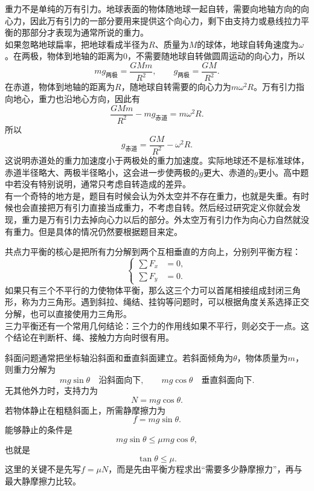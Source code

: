 \begin{casetypebox}[title={\strut\textcolor{white}{\bfseries 常见题型：重力的来源}}]
  重力不是单纯的万有引力。地球表面的物体随地球一起自转，需要向地轴方向的向心力，因此万有引力的一部分要用来提供这个向心力，剩下由支持力或悬线拉力平衡的那部分才表现为通常所说的重力。\\
  如果忽略地球扁率，把地球看成半径为$R$、质量为$M$的球体，地球自转角速度为$\omega$。在两极，物体到地轴的距离为0，不需要随地球自转做圆周运动的向心力，所以
  \[
    mg_{\text{两极}}=\frac{GMm}{R^2},
    \qquad
    g_{\text{两极}}=\frac{GM}{R^2}.
  \]
  在赤道，物体到地轴的距离为$R$，随地球自转需要的向心力为$m\omega^2R$。万有引力指向地心，重力也沿地心方向，因此有
  \[
    \frac{GMm}{R^2}-mg_{\text{赤道}}=m\omega^2R.
  \]
  所以
  \[
    g_{\text{赤道}}=\frac{GM}{R^2}-\omega^2R.
  \]
  这说明赤道处的重力加速度小于两极处的重力加速度。实际地球还不是标准球体，赤道半径略大、两极半径略小，这会进一步使两极的$g$更大、赤道的$g$更小。高中题中若没有特别说明，通常只考虑自转造成的差异。\\
  有一个奇特的地方是，题目有时候会认为外太空并不存在重力，也就是失重。有时候也会直接把万有引力直接当成重力，不考虑自转。然后经过研究定义你就会发现，重力是万有引力去掉向心力以后的部分。外太空万有引力作为向心力自然就没有重力。但是具体的情况仍然要根据题目来定。
\end{casetypebox}

\begin{casetypebox}[title={\strut\textcolor{white}{\bfseries 常见题型：共点力平衡}}]
  
  共点力平衡的核心是把所有力分解到两个互相垂直的方向上，分别列平衡方程：
  \[
    \left\{\begin{aligned}
      \sum F_x & =0, \\
      \sum F_y & =0.
    \end{aligned}\right.
  \]
  如果只有三个不平行的力使物体平衡，那么这三个力可以首尾相接组成封闭三角形，称为力三角形。遇到斜拉、绳结、挂钩等问题时，可以根据角度关系选择正交分解，也可以直接使用力三角形。\\
  三力平衡还有一个常用几何结论：三个力的作用线如果不平行，则必交于一点。这个结论在判断杆、绳、接触力方向时很有用。
\end{casetypebox}

\begin{casetypebox}[title={\strut\textcolor{white}{\bfseries 常见题型：斜面上的物体}}]
  斜面问题通常把坐标轴沿斜面和垂直斜面建立。若斜面倾角为$\theta$，物体质量为$m$，则重力分解为
  \[
    mg\sin\theta\quad\text{沿斜面向下},\qquad
    mg\cos\theta\quad\text{垂直斜面向下}.
  \]
  无其他外力时，支持力为
  \[
    N=mg\cos\theta.
  \]
  若物体静止在粗糙斜面上，所需静摩擦力为
  \[
    f=mg\sin\theta.
  \]
  能够静止的条件是
  \[
    mg\sin\theta\leq \mu mg\cos\theta,
  \]
  也就是
  \[
    \tan\theta\leq \mu.
  \]
  这里的关键不是先写$f=\mu N$，而是先由平衡方程求出“需要多少静摩擦力”，再与最大静摩擦力比较。
\end{casetypebox}

